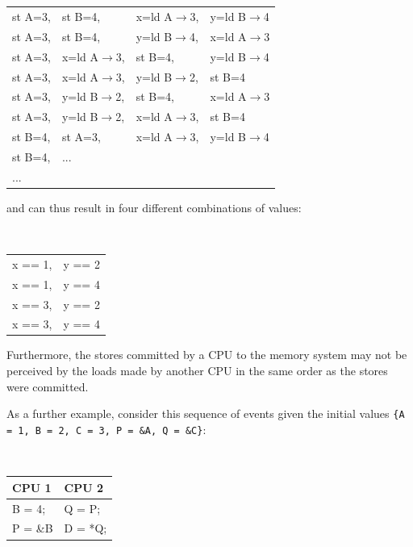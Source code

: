 ~ \\
\begin{minipage}[t]{\columnwidth}
\tt
\scriptsize
\begin{tabular}{llll}
	st A=3, & st B=4, & x=ld A$\rightarrow$3, & y=ld B$\rightarrow$4 \\
	st A=3, & st B=4, & y=ld B$\rightarrow$4, & x=ld A$\rightarrow$3 \\
	st A=3, & x=ld A$\rightarrow$3, & st B=4, & y=ld B$\rightarrow$4 \\
	st A=3, & x=ld A$\rightarrow$3, & y=ld B$\rightarrow$2, & st B=4 \\
	st A=3, & y=ld B$\rightarrow$2, & st B=4, & x=ld A$\rightarrow$3 \\
	st A=3, & y=ld B$\rightarrow$2, & x=ld A$\rightarrow$3, & st B=4 \\
	st B=4, & st A=3, & x=ld A$\rightarrow$3, & y=ld B$\rightarrow$4 \\
	st B=4, & ... & & \\
	... & & & \\
\end{tabular}
\end{minipage}
\vspace{5pt}

and can thus result in four different combinations of values:

\vspace{5pt}
\begin{minipage}[t]{\columnwidth}
\tt
\scriptsize
\begin{tabular}{ll}
	x == 1, & y == 2 \\
	x == 1, & y == 4 \\
	x == 3, & y == 2 \\
	x == 3, & y == 4 \\
\end{tabular}
\end{minipage}
\vspace{5pt}

Furthermore, the stores committed by a CPU to the memory system may not be
perceived by the loads made by another CPU in the same order as the stores were
committed.

As a further example, consider this sequence of events given the
initial values {\tt \{A = 1, B = 2, C = 3, P = \&A, Q = \&C\}}:

\vspace{5pt}
\begin{minipage}[t]{\columnwidth}
\tt
\scriptsize
\begin{tabular}{l|l}
	CPU 1 &		CPU 2 \\
	\hline
	B = 4; &	Q = P; \\
	P = \&B &	D = *Q; \\
\end{tabular}
\end{minipage}
\vspace{5pt}

